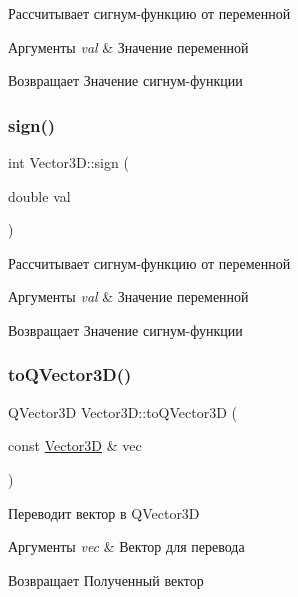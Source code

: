 Рассчитывает сигнум-\/функцию от переменной 
\begin{DoxyParams}{Аргументы}
{\em val} & Значение переменной \\
\hline
\end{DoxyParams}
\begin{DoxyReturn}{Возвращает}
Значение сигнум-\/функции 
\end{DoxyReturn}
\mbox{\label{class_vector3_d_a7572a5234eaf68003be04b2677d8f7a3}} 
\subsubsection{\texorpdfstring{sign()}{sign()}\hspace{0.1cm}{\footnotesize\ttfamily [2/2]}}
{\footnotesize\ttfamily int Vector3\+D\+::sign (\begin{DoxyParamCaption}\item[{double}]{val }\end{DoxyParamCaption})\hspace{0.3cm}{\ttfamily [static]}}

Рассчитывает сигнум-\/функцию от переменной 
\begin{DoxyParams}{Аргументы}
{\em val} & Значение переменной \\
\hline
\end{DoxyParams}
\begin{DoxyReturn}{Возвращает}
Значение сигнум-\/функции 
\end{DoxyReturn}
\mbox{\label{class_vector3_d_a049b8308f9e44f6d1ef0cd053dd68e58}} 
\subsubsection{\texorpdfstring{to\+Q\+Vector3\+D()}{toQVector3D()}}
{\footnotesize\ttfamily Q\+Vector3D Vector3\+D\+::to\+Q\+Vector3D (\begin{DoxyParamCaption}\item[{const \mbox{\hyperlink{class_vector3_d}{Vector3D}} \&}]{vec }\end{DoxyParamCaption})\hspace{0.3cm}{\ttfamily [static]}}

Переводит вектор в Q\+Vector3D 
\begin{DoxyParams}{Аргументы}
{\em vec} & Вектор для перевода \\
\hline
\end{DoxyParams}
\begin{DoxyReturn}{Возвращает}
Полученный вектор 
\end{DoxyReturn}
\mbox{\label{class_vector3_d_acc864b8a5dbf26d7a5be215618c1108f}} 
